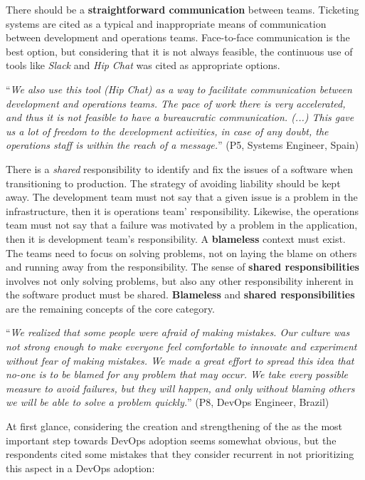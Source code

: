 There should be a \textbf{straightforward communication} between teams. Ticketing
systems are cited as a typical and inappropriate means of communication
between development and operations teams. Face-to-face communication is the best
option, but considering that it is not always feasible, the continuous use of
tools like \emph{Slack} and \emph{Hip Chat} was cited as appropriate options.

\begin{mq}
``\emph{We also use this tool (Hip Chat) as a way to facilitate communication between
development and operations teams. The pace of work there is very accelerated, and thus
it is not feasible to have a bureaucratic communication. (...) This gave us a lot of
freedom to the development activities, in case of any doubt, the operations staff
is within the reach of a message.}'' (P5, Systems Engineer, Spain)
\end{mq}

There is a \emph{shared} responsibility to identify and fix the issues
of a software when transitioning to production. The strategy of avoiding liability should be kept away.
The development team must not say that a given issue is a problem in the infrastructure, then
it is operations team' responsibility. Likewise, the operations team
must not say that a failure was motivated by a problem in the application, then it is
development team's responsibility. A \textbf{blameless} context must exist.
The teams need to focus on solving problems, not on laying the blame on others
and running away from the responsibility. The sense of \textbf{shared
responsibilities} involves not only solving problems, but also any other
responsibility inherent in the software product must be shared.
\textbf{Blameless} and \textbf{shared responsibilities} are the remaining
concepts of the core category.

\begin{mq}
``\emph{We realized that some people were afraid of making mistakes. Our
culture was not strong enough to make everyone feel comfortable to innovate and
experiment without fear of making mistakes. We made a great effort to spread
this idea that no-one is to be blamed for any problem that may occur. We take
every possible measure to avoid failures, but they will happen, and only without
blaming others we will be able to solve a problem quickly.}'' (P8, DevOps Engineer, Brazil)
\end{mq}

At first glance, considering the creation and strengthening of the \cc as the
most important step towards DevOps adoption seems somewhat obvious, but
the respondents cited some mistakes that they consider recurrent in not
prioritizing this aspect in a DevOps adoption:

